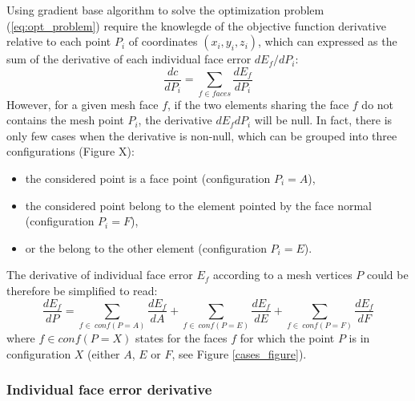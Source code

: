 \documentclass[11pt]{article}
\begin{document}
Using gradient base algorithm to solve the optimization problem (\ref{eq:opt_problem}) require the knowlegde of the objective function derivative relative to each point $P_i$ of coordinates $(x_i,y_i,z_i)$, which can expressed as the sum of the derivative of each individual face error $d E_f / dP_i$:
%
\begin{equation}
\frac{dc}{dP_i} = \sum_{f \in faces} \frac{d E_f}{d P_i}
\end{equation}
%
However, for a given mesh face $f$, if the two elements sharing the face $f$ do not contains the mesh point $P_i$, the derivative ${d E_f}{d P_i}$ will be null.
In fact, there is only few cases when the derivative is non-null, which can be grouped into three configurations (Figure X):
\begin{itemize}
\item the considered point is a face point (configuration $P_i = A$),
\item the considered point belong to the element pointed by the face normal (configuration $P_i = F$),
\item or the belong to the other element (configuration $P_i = E$).
\end{itemize}
%
The derivative of individual face error $E_f$ according to a mesh vertices $P$ could be therefore be simplified to read:
%
\begin{equation}
\frac{dE_f}{dP} = \sum_{f\in\ conf(P=A)} \frac{dE_f}{dA} + \sum_{f\in\ conf(P=E)} \frac{dE_f}{dE} +
\sum_{f\in\ conf(P=F)} \frac{dE_f}{dF} 
\end{equation}
%
where $f \in conf(P=X)$ states for the faces $f$ for which the point $P$ is in configuration $X$ (either $A$, $E$ or $F$, see Figure \ref{cases_figure}). 


\subsubsection{Individual face error derivative}
\end{document}
